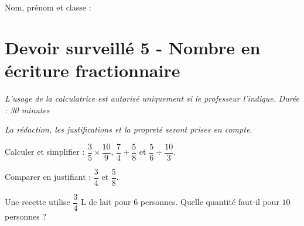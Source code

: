 \documentclass[a4paper,10pt]{report}
\begin{document}
\pagestyle{empty}
\noindent Nom, prénom et classe : \dotfill

\section*{Devoir surveillé 5 - Nombre en écriture fractionnaire}

\noindent \textit{L'usage de la calculatrice est autorisé uniquement si le professeur l'indique.} \hfill \textit{Durée : 30 minutes}

\medskip
\noindent \textit{La rédaction, les justifications et la propreté seront prises en compte.}


\begin{ex}[Calculs]
Calculer et simplifier : $\dfrac{3}{5}\times\dfrac{10}{9}$, $\dfrac{7}{4}+\dfrac{5}{8}$ et $\dfrac{5}{6}\div\dfrac{10}{3}$.
\medskip\noindent\grandscarreaux{\linewidth}{5cm}
\end{ex}
\begin{ex}[Comparer]
Comparer en justifiant : $\dfrac{3}{4}$ et $\dfrac{5}{8}$.
\medskip\noindent\grandscarreaux{\linewidth}{3cm}
\end{ex}
\begin{ex}[Problème]
Une recette utilise $\dfrac{3}{4}$ L de lait pour $6$ personnes. Quelle quantité faut-il pour $10$ personnes ?
\medskip\noindent\grandscarreaux{\linewidth}{4cm}
\end{ex}
\end{document}
